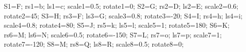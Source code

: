 \documentclass[exercice]{thedocument}%
\begin{document}
%
    \>S1=F;%
    \>rs1=b;%
    \>ls1=c;%
    \>scale1=0.5;%
    \>rotate1=0;%
    \>S2=G;%
    \>rs2=D;%
    \>ls2=E;%
    \>scale2=0.6;%
    \>rotate2=45;%
    \>S3=H;%
    \>rs3=F;%
    \>ls3=G;%
    \>scale3=0.8;%
    \>rotate3=-20;%
    \>S4=I;%
    \>rs4=h;%
    \>ls4=i;%
    \>scale4=0.8;%
    \>rotate4=80;%
    \>S5=J;%
    \>rs5=k;%
    \>ls5=l;%
    \>scale5=1;%
    \>rotate5=180;%
    \>S6=K;%
    \>rs6=M;%
    \>ls6=N;%
    \>scale6=0.5;%
    \>rotate6=-150;%
    \>S7=L;%
    \>rs7=o;%
    \>ls7=p;%
    \>scale7=1;%
    \>rotate7=-120;%
    \>S8=M;%
    \>rs8=Q;%
    \>ls8=R;%
    \>scale8=0.5;%
    \>rotate8=0;%
\end{document}
